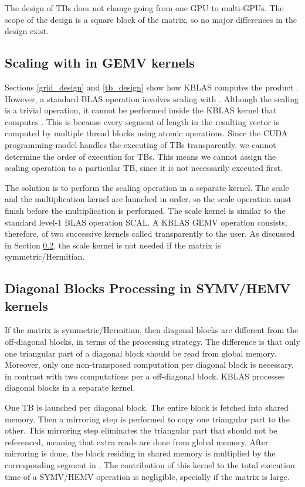 The design of TBs does not change going from one GPU to multi-GPUs. The scope of the design is 
a square block of the matrix, so no major differences in the design exist. 
\subsection{Scaling with  in GEMV kernels}
\label{beta_scaling}
Sections \ref{grid_design} and \ref{tb_design} show how KBLAS computes the product . However, a standard BLAS 
operation involves scaling  with . Although the scaling is a trivial operation, it cannot be performed inside the 
KBLAS kernel that computes . This is because every segment of length  in the resulting vector is computed by 
multiple thread blocks using atomic operations. Since the CUDA programming model handles the executing 
of TBs transparently, we cannot determine the order of execution for TBs. This means we cannot assign the scaling operation to 
a particular TB, since it is not necessarily executed first. 

The solution is to perform the scaling operation in a separate kernel. The scale and the multiplication kernel are launched 
in order, so the scale operation must finish before the multiplication is performed. The scale kernel is similar to 
the standard level-1 BLAS  operation SCAL. 
A KBLAS GEMV operation 
consists, therefore, of two successive kernels called transparently to the user. As discussed in Section \ref{symv_diag}, the scale 
kernel is not needed if the matrix is symmetric/Hermitian.
\subsection{Diagonal Blocks Processing in SYMV/HEMV kernels}
\label{symv_diag}
If the matrix is symmetric/Hermitian, then diagonal blocks are different from the off-diagonal blocks, in terms of 
the processing strategy. 
The difference is that only one triangular part of a diagonal block should be read from global memory.
Moreover, only one non-transposed computation per diagonal block is necessary, in contrast with two computations 
per a off-diagonal block. KBLAS processes diagonal blocks in a separate kernel.

One TB is launched per diagonal block. The entire block is fetched into shared memory. Then a mirroring step is performed to copy one 
triangular part to the other. This mirroring step eliminates the triangular part that should not be referenced, meaning that extra 
reads are done from global memory. After mirroring is done, the block residing in shared memory is multiplied by the 
corresponding segment in . The contribution of this kernel to the total execution time of 
a SYMV/HEMV operation is negligible, specially if the matrix is large. 

